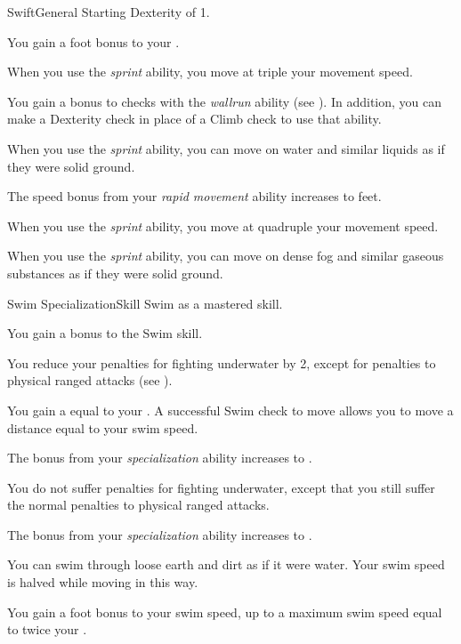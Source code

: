     \begin{feat}{Swift}{General}
        \featpre Starting Dexterity of 1.

         You gain a  foot bonus to your .

         When you use the \textit{sprint} ability, you move at triple your movement speed.

         You gain a  bonus to checks with the \textit{wallrun} ability (see ).
        In addition, you can make a Dexterity check in place of a Climb check to use that ability.

         When you use the \textit{sprint} ability, you can move on water and similar liquids as if they were solid ground.

         The speed bonus from your \textit{rapid movement} ability increases to  feet.

         When you use the \textit{sprint} ability, you move at quadruple your movement speed.

         When you use the \textit{sprint} ability, you can move on dense fog and similar gaseous substances as if they were solid ground.
    \end{feat}

    \begin{feat}{Swim Specialization}{Skill}
        \featpre Swim as a mastered skill.

         You gain a  bonus to the Swim skill.

         You reduce your penalties for fighting underwater by 2, except for penalties to physical ranged attacks (see ).

         You gain a  equal to your .
        A successful Swim check to move allows you to move a distance equal to your swim speed.

         The bonus from your \textit{specialization} ability increases to .

         You do not suffer penalties for fighting underwater, except that you still suffer the normal penalties to physical ranged attacks.

         The bonus from your \textit{specialization} ability increases to .

         You can swim through loose earth and dirt as if it were water.
        Your swim speed is halved while moving in this way.

         You gain a  foot bonus to your swim speed, up to a maximum swim speed equal to twice your .
    \end{feat}

